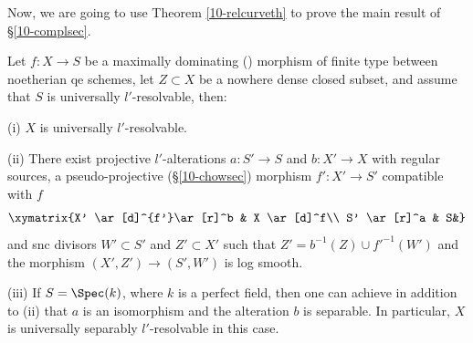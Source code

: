 \documentclass[10pt]{../fichiers-configuration-latex/smfart}
\begin{document}
Now, we are going to use Theorem \ref{10-relcurveth} to prove the main result of \S\ref{10-complsec}.

\begin{theorem}\label{10-l'theor}
Let $f{\colon}X\to S$ be a maximally dominating ()
morphism of finite type between noetherian qe schemes, let $Z\subset X$ be a nowhere
dense closed subset, and assume that $S$ is universally $l'$-resolvable, then:

(i) $X$ is universally $l'$-resolvable.

(ii) There exist projective $l'$-alterations $a{\colon}S'\to S$ and $b{\colon}X'\to X$
with regular sources, a pseudo-projective (\S\ref{10-chowsec}) morphism $f'{\colon}X'\to S'$
compatible with $f$
\begin{equation*}
\xymatrix{X' \ar[d]^{f'}\ar[r]^b & X \ar[d]^f\\
S' \ar[r]^a & S&}
\end{equation*}
and snc divisors $W'\subset S'$ and $Z'\subset X'$ such that $Z'=b^{-1}(Z)\cup f'^{-1}(W')$
and the morphism $(X',Z')\to(S',W')$ is log smooth.

(iii) If $S=\Spec(k)$, where $k$ is a perfect field, then one can achieve in addition to (ii)
that $a$ is an isomorphism and the alteration $b$ is separable. In particular, $X$ is universally
separably $l'$-resolvable in this case.
\end{theorem}
\end{document}
